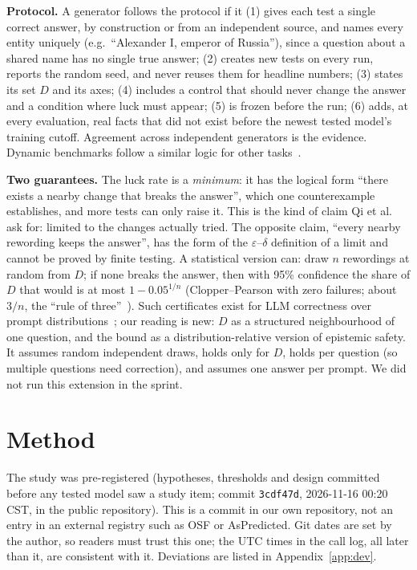 \documentclass[10pt]{article}
\begin{document}
\textbf{Protocol.} A generator follows the protocol if it (1) gives each test a single correct answer, by construction or from an independent source, and names every entity uniquely (e.g.\ ``Alexander I, emperor of Russia''), since a question about a shared name has no single true answer; (2) creates new tests on every run, reports the random seed, and never reuses them for headline numbers; (3) states its set $D$ and its axes; (4) includes a control that should never change the answer and a condition where luck must appear; (5) is frozen before the run; (6) adds, at every evaluation, real facts that did not exist before the newest tested model's training cutoff. Agreement across independent generators is the evidence. Dynamic benchmarks follow a similar logic for other tasks~\cite{gsmsym,dyval,livebench}.

\textbf{Two guarantees.} The luck rate is a \emph{minimum}: it has the logical form ``there exists a nearby change that breaks the answer'', which one counterexample establishes, and more tests can only raise it. This is the kind of claim Qi et al.~\cite{durability} ask for: limited to the changes actually tried. The opposite claim, ``every nearby rewording keeps the answer'', has the form of the $\varepsilon$--$\delta$ definition of a limit and cannot be proved by finite testing. A statistical version can: draw $n$ rewordings at random from $D$; if none breaks the answer, then with 95\% confidence the share of $D$ that would is at most $1-0.05^{1/n}$ (Clopper--Pearson with zero failures; about $3/n$, the ``rule of three''~\cite{hanley}). Such certificates exist for LLM correctness over prompt distributions~\cite{quacer,zollo}; our reading is new: $D$ as a structured neighbourhood of one question, and the bound as a distribution-relative version of epistemic safety. It assumes random independent draws, holds only for $D$, holds per question (so multiple questions need correction), and assumes one answer per prompt. We did not run this extension in the sprint.

\section{Method}
The study was pre-registered (hypotheses, thresholds and design committed before any tested model saw a study item; commit \texttt{3cdf47d}, 2026-11-16 00:20 CST, in the public repository). This is a commit in our own repository, not an entry in an external registry such as OSF or AsPredicted. Git dates are set by the author, so readers must trust this one; the UTC times in the call log, all later than it, are consistent with it. Deviations are listed in Appendix~\ref{app:dev}.
\end{document}
